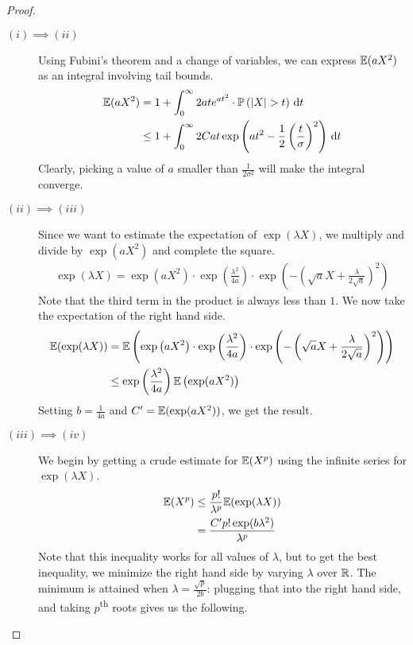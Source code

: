 \documentclass[11pt]{article}
\begin{document}
\begin{proof}
  \begin{description}
  \item[$(i) \implies (ii)$] Using Fubini's theorem and a change of variables, we can express $\mathbb{E}(aX^2)$ as an integral involving tail bounds.
    \begin{align*}
      \mathbb{E}(aX^2) &= 1 + \int_0^{\infty} 2 a t e^{at^2} \cdot \mathbb{P}\left( |X| > t \right) \mathrm{\,d} t \\
      &\leq 1 + \int_0^\infty 2Cat\exp\left( at^2 - \frac{1}{2}\left( \frac{t}{\sigma}  \right)^2 \right) \mathrm{\,d} t
    \end{align*}
    Clearly, picking a value of $a$ smaller than $\frac{1}{2\sigma^2}$ will make the integral converge.
  \item[$(ii) \implies (iii)$] Since we want to estimate the expectation of $\exp(\lambda X)$, we multiply and divide by $\exp(aX^2)$ and complete the square.
    \begin{align*}
      \exp(\lambda X) = \exp\left(aX^2\right) \cdot \exp\left( \frac{\lambda^2}{4a} \right) \cdot \exp\left( - \left( \sqrt{a}X + \frac{\lambda}{2\sqrt{a}} \right)^2 \right)
    \end{align*}
    Note that the third term in the product is always less than $1$. We now take the expectation of the right hand side.
    \begin{align*}
      \mathbb{E}(\exp(\lambda X)) &= \mathbb{E}\left( \exp\left(aX^2\right) \cdot \exp\left( \frac{\lambda^2}{4a} \right) \cdot \exp\left( - \left( \sqrt{a}X + \frac{\lambda}{2\sqrt{a}} \right)^2 \right) \right) \\
      &\leq \exp\left( \frac{\lambda^2}{4a} \right) \mathbb{E}\left( \exp(aX^2) \right)
    \end{align*}
    Setting $b= \frac{1}{4a}$ and $C^{\prime} = \mathbb{E}(\exp(aX^2))$, we get the result.
  \item[$(iii) \implies (iv)$] We begin by getting a crude estimate for $\mathbb{E}(X^p)$ using the infinite series for $\exp(\lambda X)$.
    \begin{align*}
      \mathbb{E}(X^p) &\leq \frac{p!}{\lambda^p} \mathbb{E}(\exp(\lambda X)) \\
              &= \frac{C^{\prime}p! \exp(b\lambda^2)}{\lambda^p}
    \end{align*}
    Note that this inequality works for all values of $\lambda$, but to get the best inequality, we minimize the right hand side by varying $\lambda$ over $\mathbb{R}$.
    The minimum is attained when $\lambda = \frac{\sqrt{p}}{2b}$: plugging that into the right hand side, and taking $p$\textsuperscript{th} roots gives us the following.

\end{description}
\end{proof}
\end{document}
